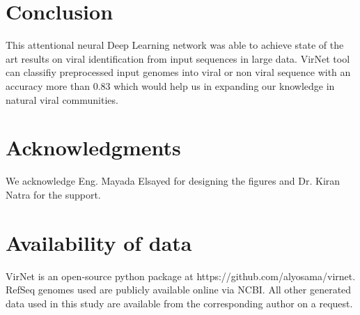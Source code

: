 \documentclass[conference]{IEEEtran}
\begin{document}
\section{Conclusion}

This attentional neural Deep Learning network was able to achieve state of the art results on viral identification from input sequences in large data.
VirNet tool can classifiy preprocessed input genomes into viral or non viral sequence with an accuracy more than 0.83 which would help us in expanding our knowledge in natural viral communities.

\section*{Acknowledgments}

We acknowledge Eng. Mayada Elsayed for designing the figures and Dr. Kiran Natra for the support.  


\section*{Availability of data}

VirNet is an open-source python package at https://github.com/alyosama/virnet. 
RefSeq genomes used are publicly available online via NCBI. All other generated data used in this study are available from the corresponding author on a request. 




\end{document}
